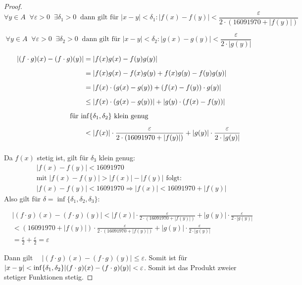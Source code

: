 \documentclass[a4paper,12pt]{article}
\theoremstyle{definition}
\theoremstyle{remark}
\begin{document}
\begin{proof}
  
  \[
    \forall y \in A \;\; \forall \varepsilon > 0 \;\; \exists \delta_1 > 0 \;\; 
    \text{dann gilt für } |x-y| < \delta_1 : |f(x) - f(y)| < \frac{\varepsilon}{2 \cdot (16091970 + |f(y)|)}
    \]
    
    \[
      \forall y \in A \;\; \forall \varepsilon > 0 \;\; \exists \delta_2 > 0 \;\; 
      \text{dann gilt für } |x-y| < \delta_2 : |g(x) - g(y)| < \frac{\varepsilon}{2 \cdot |g(y)|}
      \]
      
      \begin{align*}
        |(f \cdot g)(x) - (f \cdot g)(y)| 
        &= | f(x) g(x) - f(y) g(y) | \\[2mm]
        &= | f(x) g(x) - f(x) g(y) + f(x) g(y) - f(y) g(y) | \\[2mm]
        &= | f(x) \cdot (g(x) - g(y)) + (f(x) - f(y)) \cdot g(y) | \\[2mm]
        &\leq | f(x) \cdot (g(x) - g(y)) | + | g(y) \cdot (f(x) - f(y)) | \\[2mm]
        \makebox[0pt][l]{\hspace{-2em}für $\inf\{\delta_1, \delta_2\}$ klein genug} \\[2mm]
        &< | f(x) | \cdot \frac{\varepsilon}{2 \cdot (16091970 + |f(y)|)} + | g(y) | \cdot \frac{\varepsilon}{2 \cdot |g(y)|}  \\[2mm]
      \end{align*}
      
      Da $f(x)$ stetig ist, gilt für $\delta_3$ klein genug:
      \begin{align*}
        &|f(x) - f(y)| < 16091970 \\[2mm]
        &\text{mit } |f(x) - f(y)| > |f(x)| - |f(y)| \text{ folgt:} \\[2mm]
        &|f(x) - f(y)| < 16091970 \Rightarrow |f(x)| < 16091970 + |f(y)|  
      \end{align*}
      Also gilt für $\delta = \inf\{\delta_1, \delta_2, \delta_3\}$:

      \begin{align*}
        &|(f \cdot g)(x) - (f \cdot g)(y)| < | f(x) | \cdot \frac{\varepsilon}{2 \cdot (16091970 + |f(y)|)} + | g(y) | \cdot \frac{\varepsilon}{2 \cdot |g(y)|}  \\[2mm]
        &< (16091970 + |f(y)|) \cdot \frac{\varepsilon}{2 \cdot (16091970 + |f(y)|)} + | g(y) | \cdot \frac{\varepsilon}{2 \cdot |g(y)|} \\[2mm]
        &= \frac{\varepsilon}{2} + \frac{\varepsilon}{2} = \varepsilon
      \end{align*}


Dann gilt $\quad |(f \cdot g)(x) - (f \cdot g)(y)| \leq \varepsilon.$ Somit ist für 
$\vert x-y \vert < \inf\{\delta_1, \delta_2\} \\ \vert(f\cdot g)(x) - (f\cdot g)(y)\vert < \varepsilon$. 
Somit ist das Produkt zweier stetiger Funktionen stetig. 


\end{proof}
\end{document}

